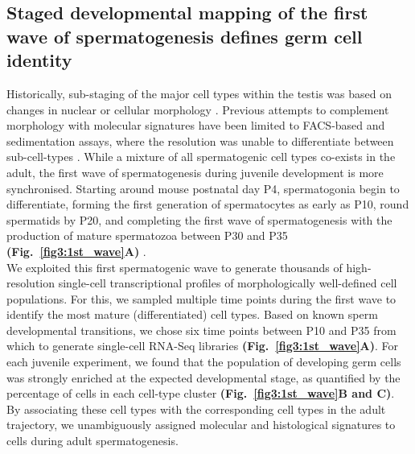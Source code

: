 \subsection*{Staged developmental mapping of the first wave of spermatogenesis defines germ cell identity}

Historically, sub-staging of the major cell types within the testis was based on changes in nuclear or cellular morphology \citep{Oakberg1956,  Oakberg1956a}. Previous attempts to complement morphology with molecular signatures have been limited to FACS-based and sedimentation assays, where the resolution was unable to differentiate between sub-cell-types \citep{Bastos2005, Gaysinskaya2014, Lam1970, Meistrich1977, Romrell1976, Soumillon2013}. While a mixture of all spermatogenic cell types co-exists in the adult, the first wave of spermatogenesis during juvenile development is more synchronised. Starting around mouse postnatal day P4, spermatogonia begin to differentiate, forming the first generation of spermatocytes as early as P10, round spermatids by P20, and completing the first wave of spermatogenesis with the production of mature spermatozoa between P30 and P35 \textbf{(Fig.~\ref{fig3:1st_wave}A)} \citep{Bellve1977, Janca1986, Nebel1961}.\\
 
We exploited this first spermatogenic wave to generate thousands of high-resolution single-cell transcriptional profiles of morphologically well-defined cell populations. For this, we sampled multiple time points during the first wave to identify the most mature (differentiated) cell types. Based on known sperm developmental transitions, we chose six time points between P10 and P35 from which to generate single-cell RNA-Seq libraries \textbf{(Fig.~\ref{fig3:1st_wave}A)}. For each juvenile experiment, we found that the population of developing germ cells was strongly enriched at the expected developmental stage, as quantified by the percentage of cells in each cell-type cluster \textbf{(Fig.~\ref{fig3:1st_wave}B and C)}. By associating these cell types with the corresponding cell types in the adult trajectory, we unambiguously assigned molecular and histological signatures to cells during adult spermatogenesis.\\


